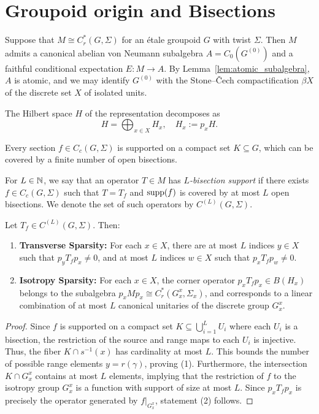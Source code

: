 \section{Groupoid origin and Bisections}

Suppose that $M \cong C_r^*(G,\Sigma)$ for an étale groupoid $G$ with twist $\Sigma$. Then $M$ admits a canonical abelian von Neumann subalgebra $A = C_0(G^{(0)})$ and a faithful conditional expectation $E : M \to A$. By Lemma~\ref{lem:atomic_subalgebra}, $A$ is atomic, and we may identify $G^{(0)}$ with the Stone--\v{C}ech compactification $\beta X$ of the discrete set $X$ of isolated units. 

The Hilbert space $H$ of the representation decomposes as
\[
H = \bigoplus_{x \in X} H_x, \quad H_x := p_x H.
\]

Every section $f \in C_c(G,\Sigma)$ is supported on a compact set $K \subseteq G$, which can be covered by a finite number of open bisections. 

\begin{definition}
For $L \in \mathbb N$, we say that an operator $T \in M$ has \emph{$L$-bisection support} if there exists $f \in C_c(G,\Sigma)$ such that $T = T_f$ and $\mathrm{supp}(f)$ is covered by at most $L$ open bisections. We denote the set of such operators by $C^{(L)}(G,\Sigma)$.
\end{definition}

\begin{lemma}\label{lem:L_bisection_properties}
Let $T_f \in C^{(L)}(G,\Sigma)$. Then:
\begin{enumerate}
    \item \textbf{Transverse Sparsity:} For each $x \in X$, there are at most $L$ indices $y \in X$ such that $p_y T_f p_x \neq 0$, and at most $L$ indices $w \in X$ such that $p_x T_f p_w \neq 0$.
    \item \textbf{Isotropy Sparsity:} For each $x \in X$, the corner operator $p_x T_f p_x \in B(H_x)$ belongs to the subalgebra $p_x M p_x \cong C_r^*(G_x^x, \Sigma_x)$, and corresponds to a linear combination of at most $L$ canonical unitaries of the discrete group $G_x^x$.
\end{enumerate}
\end{lemma}

\begin{proof}
Since $f$ is supported on a compact set $K \subseteq \bigcup_{i=1}^L U_i$ where each $U_i$ is a bisection, the restriction of the source and range maps to each $U_i$ is injective. Thus, the fiber $K \cap s^{-1}(x)$ has cardinality at most $L$. This bounds the number of possible range elements $y = r(\gamma)$, proving (1). Furthermore, the intersection $K \cap G_x^x$ contains at most $L$ elements, implying that the restriction of $f$ to the isotropy group $G_x^x$ is a function with support of size at most $L$. Since $p_x T_f p_x$ is precisely the operator generated by $f|_{G_x^x}$, statement (2) follows.
\end{proof}


